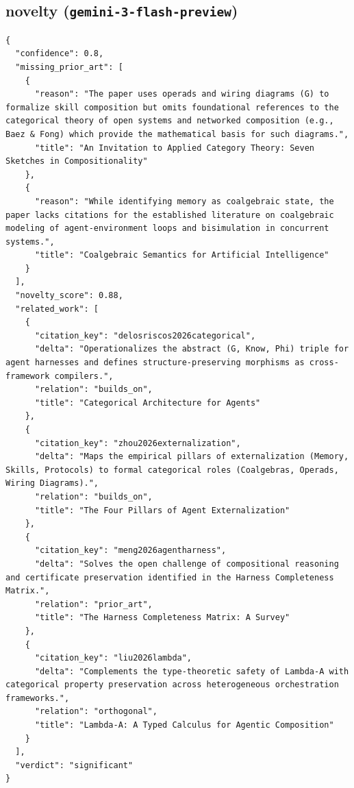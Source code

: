\documentclass[11pt]{article}
\begin{document}
\subsection*{novelty (\texttt{gemini-3-flash-preview})}
\begin{verbatim}
{
  "confidence": 0.8,
  "missing_prior_art": [
    {
      "reason": "The paper uses operads and wiring diagrams (G) to formalize skill composition but omits foundational references to the categorical theory of open systems and networked composition (e.g., Baez & Fong) which provide the mathematical basis for such diagrams.",
      "title": "An Invitation to Applied Category Theory: Seven Sketches in Compositionality"
    },
    {
      "reason": "While identifying memory as coalgebraic state, the paper lacks citations for the established literature on coalgebraic modeling of agent-environment loops and bisimulation in concurrent systems.",
      "title": "Coalgebraic Semantics for Artificial Intelligence"
    }
  ],
  "novelty_score": 0.88,
  "related_work": [
    {
      "citation_key": "delosriscos2026categorical",
      "delta": "Operationalizes the abstract (G, Know, Phi) triple for agent harnesses and defines structure-preserving morphisms as cross-framework compilers.",
      "relation": "builds_on",
      "title": "Categorical Architecture for Agents"
    },
    {
      "citation_key": "zhou2026externalization",
      "delta": "Maps the empirical pillars of externalization (Memory, Skills, Protocols) to formal categorical roles (Coalgebras, Operads, Wiring Diagrams).",
      "relation": "builds_on",
      "title": "The Four Pillars of Agent Externalization"
    },
    {
      "citation_key": "meng2026agentharness",
      "delta": "Solves the open challenge of compositional reasoning and certificate preservation identified in the Harness Completeness Matrix.",
      "relation": "prior_art",
      "title": "The Harness Completeness Matrix: A Survey"
    },
    {
      "citation_key": "liu2026lambda",
      "delta": "Complements the type-theoretic safety of Lambda-A with categorical property preservation across heterogeneous orchestration frameworks.",
      "relation": "orthogonal",
      "title": "Lambda-A: A Typed Calculus for Agentic Composition"
    }
  ],
  "verdict": "significant"
}
\end{verbatim}
\end{document}
